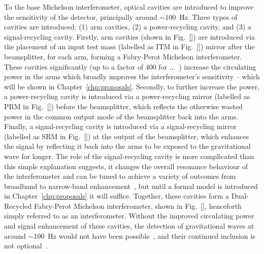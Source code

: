 To the base Michelson interferometer, optical cavities are introduced to improve the sensitivity of the detector, principally around $\sim100$~Hz. Three types of cavities are introduced: (1) arm cavities, (2) a power-recycling cavity, and (3) a signal-recycling cavity. 
Firstly, arm cavities (shown in Fig.~\ref{}) are introduced via the placement of an input test mass (labelled as ITM in Fig.~\ref{}) mirror after the beamsplitter, for each arm, forming a Fabry-Perot Michelson interferometer. These cavities significantly (up to a factor of 400 for ...~\cite{}) increase the circulating power in the arms which broadly improves the interferometer's sensitivity -- which will be shown in Chapter~\ref{chp:proposals}. 
Secondly, to further increase the power, a power-recycling cavity is introduced via a power-recycling mirror (labelled as PRM in Fig.~\ref{}) before the beamsplitter, which reflects the otherwise wasted power in the common output mode of the beamsplitter back into the arms. 
Finally, a signal-recycling cavity is introduced via a signal-recycling mirror (labelled as SRM in Fig.~\ref{}) at the output of the beamsplitter, which enhances the signal by reflecting it back into the arms to be exposed to the gravitational wave for longer. The role of the signal-recycling cavity is more complicated than this simple explanation suggests, it changes the overall resonance behaviour of the interferometer and can be tuned to achieve a variety of outcomes from broadband to narrow-band enhancement~\cite{}, but until a formal model is introduced in Chapter~\ref{chp:proposals} it will suffice. 
Together, these cavities form a Dual-Recycled Fabry-Perot Michelson interferometer, shown in Fig.~\ref{}, henceforth simply referred to as an interferometer. Without the improved circulating power and signal enhancement of these cavities, the detection of gravitational waves at around $\sim100$~Hz would not have been possible~\cite{}, and their continued inclusion is not optional~\cite{}.

